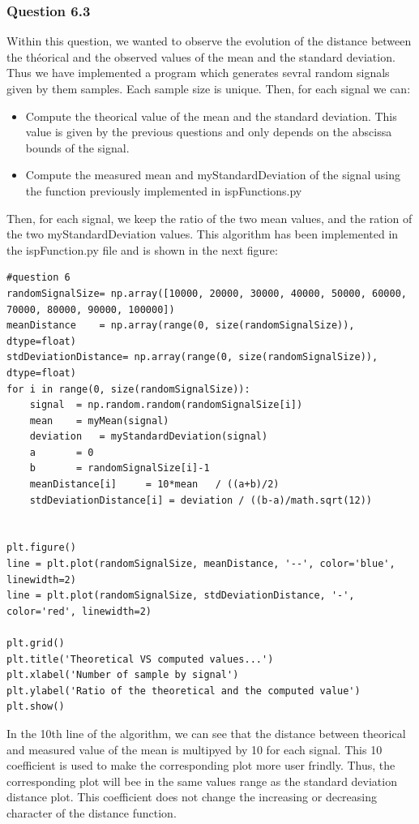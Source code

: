 \documentclass[a4paper,10pt]{article}
\begin{document}
    \subsubsection{Question 6.3 }
    Within this question, we wanted to observe the evolution of the distance between the théorical and the observed values of the mean and the standard deviation.
    Thus we have implemented a program which generates sevral random signals given by them samples.  Each sample size is unique.   Then, for each signal we can:\newline
    \begin{itemize}
     \item Compute the theorical value of the mean and the standard deviation.  This value is given by the previous questions and only depends on the abscissa bounds of the signal.
     \item Compute the measured mean and myStandardDeviation of the signal using the function previously implemented in ispFunctions.py
    \end{itemize}
    Then, for each signal, we keep the ratio of the two mean values, and the ration of the two myStandardDeviation values.\newline
    This algorithm has been implemented in the ispFunction.py file and is shown in the next figure:
    \begin{lstlisting}
#question 6
randomSignalSize= np.array([10000, 20000, 30000, 40000, 50000, 60000, 70000, 80000, 90000, 100000])
meanDistance	= np.array(range(0, size(randomSignalSize)), dtype=float)
stdDeviationDistance= np.array(range(0, size(randomSignalSize)), dtype=float)
for i in range(0, size(randomSignalSize)):
    signal	= np.random.random(randomSignalSize[i])
    mean	= myMean(signal)
    deviation	= myStandardDeviation(signal)
    a  		= 0
    b		= randomSignalSize[i]-1
    meanDistance[i]		= 10*mean	/ ((a+b)/2)
    stdDeviationDistance[i]	= deviation	/ ((b-a)/math.sqrt(12))


plt.figure()
line = plt.plot(randomSignalSize, meanDistance, '--', color='blue', linewidth=2)
line = plt.plot(randomSignalSize, stdDeviationDistance, '-', color='red', linewidth=2)

plt.grid()
plt.title('Theoretical VS computed values...')
plt.xlabel('Number of sample by signal')
plt.ylabel('Ratio of the theoretical and the computed value')
plt.show()
    \end{lstlisting}

    In the 10th line of the algorithm, we can see that the distance between theorical and measured value of the mean is multipyed by 10 for each signal.
    This 10 coefficient is used to make the corresponding plot more user frindly.  
    Thus, the corresponding plot will bee in the same values range as the standard deviation distance plot.  
    This coefficient does not change the increasing or decreasing character of the distance function.
\end{document}
